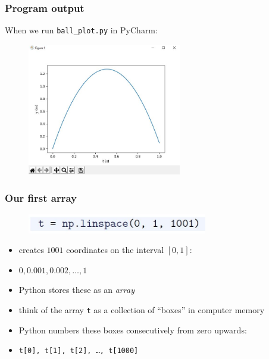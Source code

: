 \documentclass[14pt]{beamer}
\newcommand\red[1]{{\color{red} #1}}
\begin{document}

\begin{frame}[fragile]

\frametitle{Program output}

When we run \texttt{ball\_plot.py} in PyCharm:
\begin{figure}[ht]
	\centering
	\includegraphics[width=0.6\textwidth]{figures/LLp20output}
\end{figure}

\end{frame}


\begin{frame}[fragile]

\frametitle{Our first array}

\begin{figure}[ht]
	\centering
	\includegraphics[width=0.7\textwidth]{figures/LLp20b}
\end{figure}
\vspace*{-8mm}
\begin{itemize}
	\item creates $1001$ coordinates on the interval $[0,1]$:
	\item[] $0, 0.001, 0.002, \ldots, 1$
	\item Python stores these as an \red{\emph{array}}
	\item think of the array \texttt{t} as a collection of ``boxes'' in computer memory
	\item Python numbers these boxes consecutively from zero upwards:
	\item[] \texttt{t[0], t[1], t[2], \ldots, t[1000]}
\end{itemize}

\end{frame}
\end{document}
